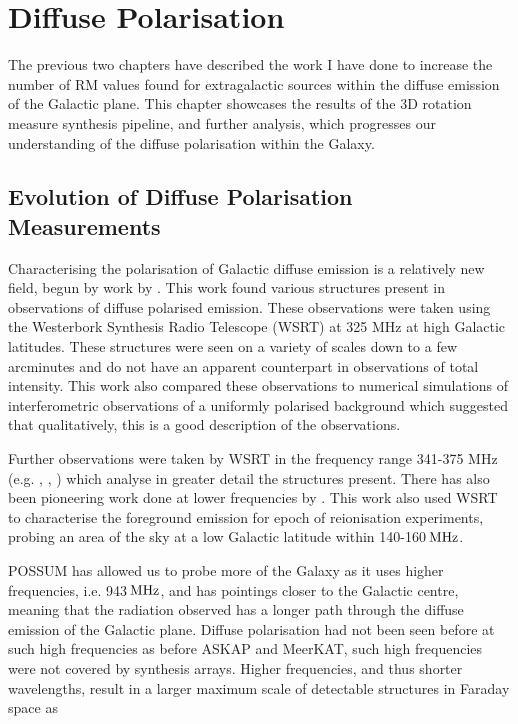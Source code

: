 \chapter{Diffuse Polarisation}
\label{ch: Canals}

The previous two chapters have described the work I have done to increase the number of RM values found for extragalactic sources within the diffuse emission of the Galactic plane. This chapter showcases the results of the 3D rotation measure synthesis pipeline, and further analysis, which progresses our understanding of the diffuse polarisation within the Galaxy.

\section{Evolution of Diffuse Polarisation Measurements }

Characterising the polarisation of Galactic diffuse emission is a relatively new field, begun by work by \cite{Wieringa_1993}. This work found various structures present in observations of diffuse polarised emission. These observations were taken using the Westerbork Synthesis Radio Telescope (WSRT) at 325 MHz at high Galactic latitudes. These structures were seen on a variety of scales down to a few arcminutes and do not have an apparent counterpart in observations of total intensity. This work also compared these observations to numerical simulations of interferometric observations of a uniformly polarised background which suggested that qualitatively, this is a good description of the observations.

Further observations were taken by WSRT in the frequency range 341-375 MHz (e.g. \cite{Haverkornetal_2000}, \cite{Haverkorn_2001}, \cite{Haverkorn_2004}) which analyse in greater detail the structures present. 
There has also been pioneering work done at lower frequencies by \cite{Bernardi_2009}. This work also used WSRT to characterise the foreground emission for epoch of reionisation experiments, probing an area of the sky at a low Galactic latitude within 140-160${\rm\,MHz}$. 

POSSUM has allowed us to probe more of the Galaxy as it uses higher frequencies, i.e. 943$\,{\rm MHz}$, and has pointings closer to the Galactic centre, meaning that the radiation observed has a longer path through the diffuse emission of the Galactic plane. Diffuse polarisation had not been seen before at such high frequencies as before ASKAP and MeerKAT, such high frequencies were not covered by synthesis arrays. Higher frequencies, and thus shorter wavelengths, result in a larger maximum scale of detectable structures in Faraday space as

